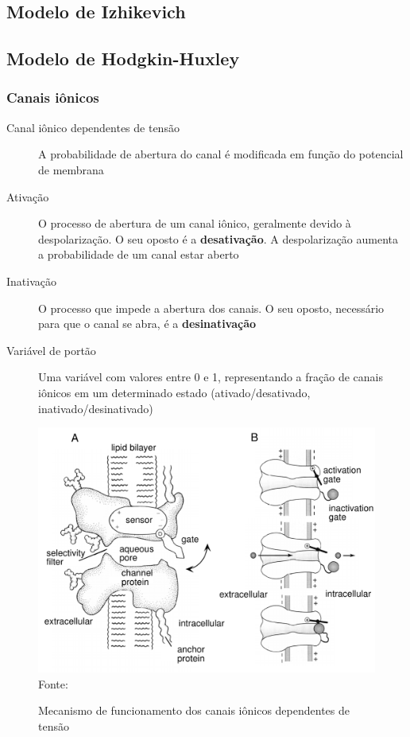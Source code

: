 \subsection{Modelo de Izhikevich}\label{sec:izhikevich}

\subsection{Modelo de Hodgkin-Huxley}\label{sec:modelohh}
\subsubsection{Canais iônicos}
\cite{miller_introductory_2018}
\begin{description}
	\item[Canal iônico dependentes de tensão] A probabilidade de abertura do canal é modificada em função do potencial de membrana
	\item[Ativação] O processo de abertura de um canal iônico, geralmente devido à despolarização. O seu oposto é a \textbf{desativação}. A despolarização aumenta a probabilidade de um canal estar aberto
	\item[Inativação] O processo que impede a abertura dos canais. O seu oposto, necessário para que o canal se abra, é a \textbf{desinativação}
	\item[Variável de portão] Uma variável com valores entre 0 e 1, representando a fração de canais iônicos em um determinado estado (ativado/desativado, inativado/desinativado)
\end{description}

\begin{figure}[htb!]
	\centering
	\caption{Mecanismo de funcionamento dos canais iônicos dependentes de tensão}
	\label{fig:canais}
	\includegraphics[width=0.6\linewidth]{figs/canais}\\
	\small{Fonte: \cite{dayan_theoretical_2001}}
\end{figure}


